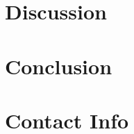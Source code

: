 \documentclass[a0,24pt]{sciposter}
\begin{document}
\begin{multicols}{2}
\begin{figure}[p!h]
\end{figure}

\section{Discussion}

\lipsum[5]

\section{Conclusion}

\lipsum[5]

\section{Contact Info}


\end{multicols}
\end{document}
